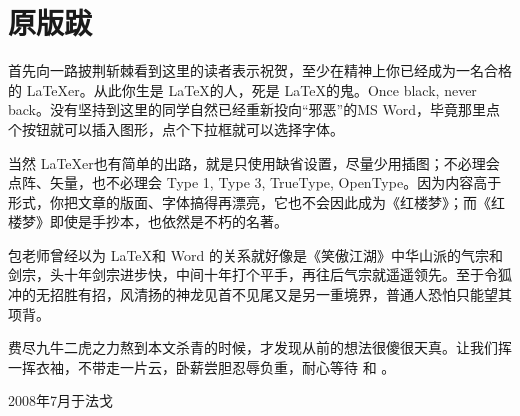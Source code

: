 \chapter{原版跋}

首先向一路披荆斩棘看到这里的读者表示祝贺，至少在精神上你已经成为一名合格的 \LaTeX{}er。从此你生是 \LaTeX 的人，死是 \LaTeX 的鬼。Once black, never back。没有坚持到这里的同学自然已经重新投向“邪恶”的MS Word，毕竟那里点个按钮就可以插入图形，点个下拉框就可以选择字体。

当然 \LaTeX{}er也有简单的出路，就是只使用缺省设置，尽量少用插图；不必理会点阵、矢量，也不必理会 Type 1, Type 3, TrueType, OpenType。因为内容高于形式，你把文章的版面、字体搞得再漂亮，它也不会因此成为《红楼梦》；而《红楼梦》即使是手抄本，也依然是不朽的名著。

包老师曾经以为 \LaTeX 和 Word 的关系就好像是《笑傲江湖》中华山派的气宗和剑宗，头十年剑宗进步快，中间十年打个平手，再往后气宗就遥遥领先。至于令狐冲的无招胜有招，风清扬的神龙见首不见尾又是另一重境界，普通人恐怕只能望其项背。

费尽九牛二虎之力熬到本文杀青的时候，才发现从前的想法很傻很天真。让我们挥一挥衣袖，不带走一片云，卧薪尝胆忍辱负重，耐心等待 \XeTeX 和 \LuaTeX。

\begin{flushright}
  2008年7月于法戈
\end{flushright}
